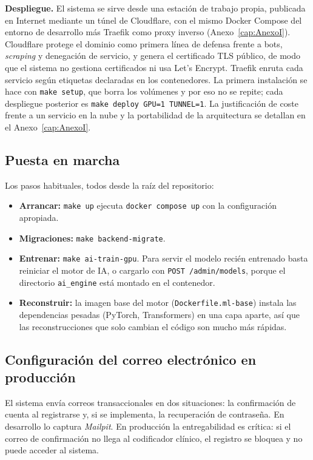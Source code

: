 \textbf{Despliegue.} El sistema se sirve desde una estación de trabajo propia, publicada en Internet mediante un túnel de Cloudflare, con el mismo Docker Compose del entorno de desarrollo más Traefik como proxy inverso (Anexo~\ref{cap:AnexoI}). Cloudflare protege el dominio como primera línea de defensa frente a bots, \emph{scraping} y denegación de servicio, y genera el certificado TLS público, de modo que el sistema no gestiona certificados ni usa Let's Encrypt. Traefik enruta cada servicio según etiquetas declaradas en los contenedores. La primera instalación se hace con \texttt{make setup}, que borra los volúmenes y por eso no se repite; cada despliegue posterior es \texttt{make deploy GPU=1 TUNNEL=1}. La justificación de coste frente a un servicio en la nube y la portabilidad de la arquitectura se detallan en el Anexo~\ref{cap:AnexoI}.

\subsection{Puesta en marcha}

Los pasos habituales, todos desde la raíz del repositorio:

\begin{itemize}
 \item \textbf{Arrancar:} \texttt{make up} ejecuta \texttt{docker compose up} con la configuración apropiada.
 \item \textbf{Migraciones:} \texttt{make backend-migrate}.
 \item \textbf{Entrenar:} \texttt{make ai-train-gpu}. Para servir el modelo recién entrenado basta reiniciar el motor de IA, o cargarlo con \texttt{POST /admin/models}, porque el directorio \texttt{ai\_engine} está montado en el contenedor.
 \item \textbf{Reconstruir:} la imagen base del motor (\texttt{Dockerfile.ml-base}) instala las dependencias pesadas (PyTorch, Transformers) en una capa aparte, así que las reconstrucciones que solo cambian el código son mucho más rápidas.
\end{itemize}


\subsection{Configuración del correo electrónico en producción}

El sistema envía correos transaccionales en dos situaciones: la confirmación de cuenta al registrarse y, si se implementa, la recuperación de contraseña. En desarrollo lo captura \textit{Mailpit}. En producción la entregabilidad es crítica: si el correo de confirmación no llega al codificador clínico, el registro se bloquea y no puede acceder al sistema.


